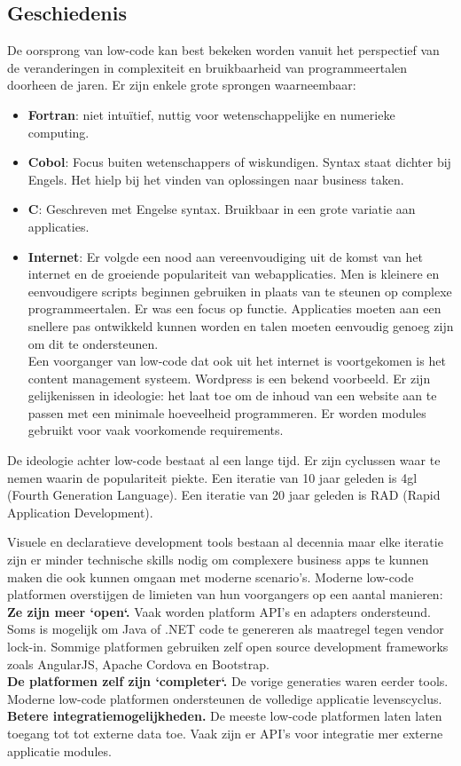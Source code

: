 \subsection{Geschiedenis}

De oorsprong van low-code kan best bekeken worden vanuit het perspectief van de veranderingen in complexiteit en bruikbaarheid van programmeertalen doorheen de jaren. Er zijn enkele grote sprongen waarneembaar:
\begin{itemize}
    \item \textbf{Fortran}: niet intuïtief, nuttig voor wetenschappelijke en numerieke computing.
    \item \textbf{Cobol}: Focus buiten wetenschappers of wiskundigen. Syntax staat dichter bij Engels. Het hielp bij het vinden van oplossingen naar business taken.
    \item \textbf{C}: Geschreven met Engelse syntax. Bruikbaar in een grote variatie aan applicaties.
    \item \textbf{Internet}: Er volgde een nood aan vereenvoudiging uit de komst van het internet en de groeiende populariteit van webapplicaties. Men is kleinere en eenvoudigere scripts beginnen gebruiken in plaats van te steunen op complexe programmeertalen. Er was een focus op functie. Applicaties moeten aan een snellere pas ontwikkeld kunnen worden en talen moeten eenvoudig genoeg zijn om dit te ondersteunen.\\
    Een voorganger van low-code dat ook uit het internet is voortgekomen is het content management systeem. Wordpress is een bekend voorbeeld. Er zijn gelijkenissen in ideologie: het laat toe om de inhoud van een website aan te passen met een minimale hoeveelheid programmeren. Er worden modules gebruikt voor vaak voorkomende requirements. \autocite{Kissflow2018}
\end{itemize} \autocite{Kissflow2018a}

De ideologie achter low-code bestaat al een lange tijd. Er zijn cyclussen waar te nemen waarin de populariteit piekte. Een iteratie van 10 jaar geleden is 4gl (Fourth Generation Language). Een iteratie van 20 jaar geleden is RAD (Rapid Application Development). %

Visuele en declaratieve development tools bestaan al decennia maar elke iteratie zijn er minder technische skills nodig om complexere business apps te kunnen maken die ook kunnen omgaan met moderne scenario's. Moderne low-code platformen overstijgen de limieten van hun voorgangers op een aantal manieren: \\
\textbf{Ze zijn meer `open`.} Vaak worden platform API's en adapters ondersteund. Soms is mogelijk om Java of .NET code te genereren als maatregel tegen vendor lock-in. Sommige platformen gebruiken zelf open source development frameworks zoals AngularJS, Apache Cordova en Bootstrap.\\
\textbf{De platformen zelf zijn `completer`.} De vorige generaties waren eerder tools. Moderne low-code platformen ondersteunen de volledige applicatie levenscyclus.\\
\textbf{Betere integratiemogelijkheden.} De meeste low-code platformen laten laten toegang tot tot externe data toe. Vaak zijn er API's voor integratie mer externe applicatie modules. 

